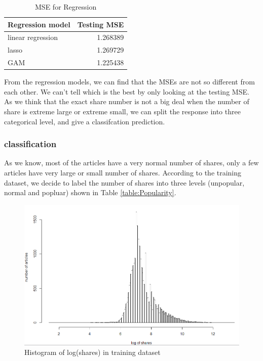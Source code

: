 \documentclass[11pt]{article}
\begin{document}
    \begin{table}[h]
        \centering
        \caption{MSE for Regression}
        \begin{tabular}{ l | r }
            \hline\hline
            Regression model & Testing MSE\\
            \hline
            linear regression & 1.268389 \\
            lasso & 1.269729 \\
            GAM & 1.225438 \\
            \hline\hline
        \end{tabular}
        \label{table:1}
    \end{table}

From the regression models, we can find that the MSEs are not so different from each other. We can't tell which is the best by only looking at the testing MSE. As we think that the exact share number is not a big deal when the number of share is extreme large or extreme small, we can split the response into three categorical level, and give a classifcation prediction.

\subsubsection{classification}
As we know, most of the articles have a very normal number of shares, only a few articles have very large or small number of shares. According to the training dataset, we decide to label the number of shares into three levels (unpopular, normal and popluar) shown in Table \ref{table:Popularity}. \\

    \begin{figure}[h]
        \centering
        \includegraphics[width=0.7\linewidth]{logy.png}
        \caption{Histogram of log(shares) in training dataset}
    \end{figure}
\end{document}
